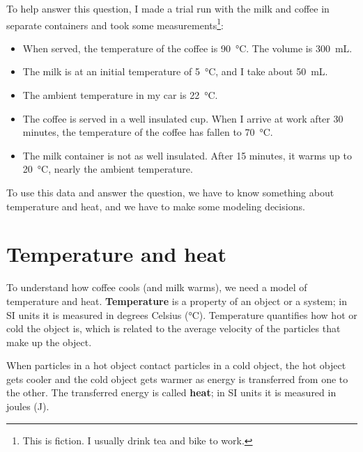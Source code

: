 \documentclass[12pt]{book}
\theoremstyle{exercise}
\begin{document}
To help answer this question, I made a trial run with the milk and coffee in separate containers and took some measurements\footnote{This is fiction.  I usually drink tea and bike to work.}:

\begin{itemize}

\item When served, the temperature of the coffee is \SI{90}{\celsius}.  The volume is \SI{300}{mL}.

\item The milk is at an initial temperature of \SI{5}{\celsius}, and I take about \SI{50}{mL}.

\item The ambient temperature in my car is \SI{22}{\celsius}.

\item The coffee is served in a well insulated cup.  When I arrive at work after 30 minutes, the temperature of the coffee has fallen to \SI{70}{\celsius}.

\item The milk container is not as well insulated.  After 15 minutes, it warms up to \SI{20}{\celsius}, nearly the ambient temperature.

\end{itemize}

To use this data and answer the question, we have to know something about temperature and heat, and we have to make some modeling decisions.


\section{Temperature and heat}

To understand how coffee cools (and milk warms), we need a model of temperature and heat.  {\bf Temperature} is a property of an object or a system; in SI units it is measured in degrees Celsius (\si{\celsius}).  Temperature quantifies how hot or cold the object is, which is related to the average velocity of the particles that make up the object.


When particles in a hot object contact particles in a cold object, the hot object gets cooler and the cold object gets warmer as energy is transferred from one to the other.  
The transferred energy is called {\bf heat}; in SI units it is measured in joules (\si{\joule}).

\end{document}
